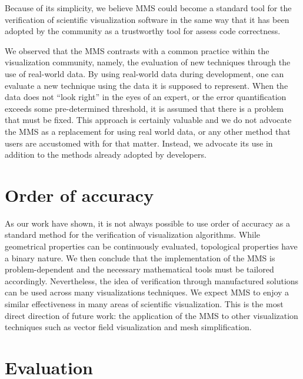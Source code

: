 %
%
Because of its simplicity, we believe MMS could become a standard tool for the verification of scientific visualization software in the same way that it has been adopted by the \cse{} community as a trustworthy tool for assess code correctness.


We observed that the MMS contrasts with a common practice within the visualization community, namely, the evaluation of new techniques through the use of real-world data.  
%
By using real-world data during development, one can evaluate a new technique using the data it is supposed to represent. 
%
When the data does not ``look right'' in the eyes of an expert, or the error quantification exceeds some pre-determined threshold, it is assumed that there is a problem that must be fixed.
%
This approach is certainly valuable and we do not advocate the MMS as a replacement for using real world data, or any other method that users are accustomed with for that matter. 
%
Instead, we advocate its use in addition to the methods already adopted by developers.

\section{Order of accuracy}

As our work have shown, it is not always possible to use order of accuracy as a standard method for the verification of visualization algorithms. 
%
While geometrical properties can be continuously evaluated, topological properties have a binary nature.
%
We then conclude that the implementation of the MMS is problem-dependent and the necessary mathematical tools must be tailored accordingly. 
%
Nevertheless, the idea of verification through manufactured solutions can be used across many visualizations techniques. 
%
We expect MMS to enjoy a similar effectiveness in many areas of scientific visualization.
%
This is the most direct direction of future work: the application of the MMS to other visualization techniques such as vector field visualization and mesh simplification.


\section{Evaluation}

